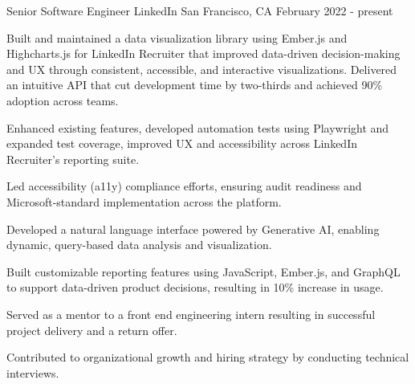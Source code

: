 
\begin{cventries}

  \cventry
    {Senior Software Engineer} %
    {LinkedIn} %
    {San Francisco, CA} %
    {February 2022 - present} %
    {
      \begin{cvitems} %
        \item {Built and maintained a data visualization library using Ember.js and Highcharts.js for LinkedIn Recruiter that improved data-driven decision-making and UX through consistent, accessible, and interactive visualizations. 
        Delivered an intuitive API that cut development time by two-thirds and achieved 90\% adoption across teams.}
        \item {Enhanced existing features, developed automation tests using Playwright and expanded test coverage, improved UX and accessibility across LinkedIn Recruiter's reporting suite.} 
        \item {Led accessibility (a11y) compliance efforts, ensuring audit readiness and Microsoft-standard implementation across the platform.} 
        \item {Developed a natural language interface powered by Generative AI, enabling dynamic, query-based data analysis and visualization.}
        \item {Built customizable reporting features using JavaScript, Ember.js, and GraphQL to support data-driven product decisions, resulting in 10\% increase in usage.}
        \item {Served as a mentor to a front end engineering intern resulting in successful project delivery and a return offer.} 
        \item {Contributed to organizational growth and hiring strategy by conducting technical interviews.}
      \end{cvitems}
    }


\end{cventries}
